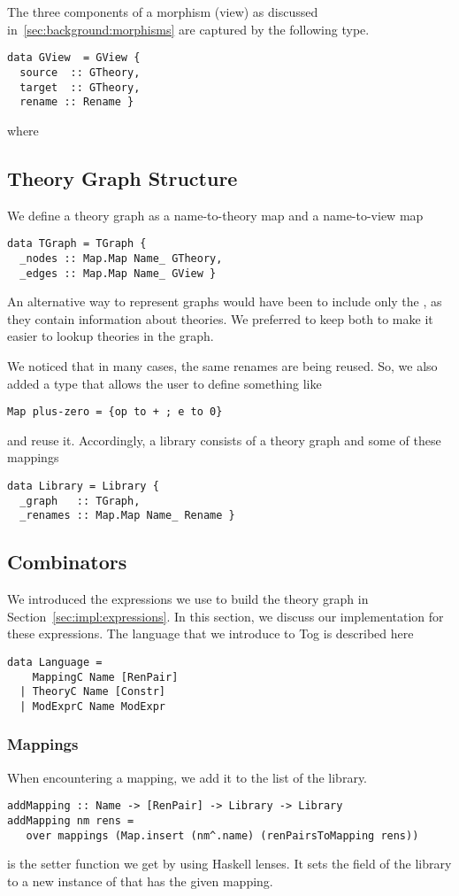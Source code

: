 The three components of a morphism (view) as discussed in~\ref{sec:background:morphisms} are captured by the following type. 
\begin{verbatim}
data GView  = GView {
  source  :: GTheory,
  target  :: GTheory,
  rename :: Rename }  
\end{verbatim}
where 

\subsection{Theory Graph Structure}
We define a theory graph as a name-to-theory map and a name-to-view map 
\begin{verbatim}
data TGraph = TGraph { 
  _nodes :: Map.Map Name_ GTheory,
  _edges :: Map.Map Name_ GView } 
\end{verbatim}
An alternative way to represent graphs would have been to include only the , as they contain information about theories. We preferred to keep both to make it easier to lookup theories in the graph. 

We noticed that in many cases, the same renames are being reused. So, we also added a  type that allows the user to define something like 
\begin{lstlisting}
Map plus-zero = {op to + ; e to 0}
\end{lstlisting}
and reuse it. Accordingly, a library consists of a theory graph and some of these mappings 
\begin{verbatim}
data Library = Library {
  _graph   :: TGraph,
  _renames :: Map.Map Name_ Rename }
\end{verbatim}

\subsection{Combinators}
We introduced the expressions we use to build the theory graph in Section~\ref{sec:impl:expressions}. In this section, we discuss our implementation for these expressions. The language that we introduce to Tog is described here 
\begin{lstlisting}
data Language = 
    MappingC Name [RenPair]
  | TheoryC Name [Constr]
  | ModExprC Name ModExpr
\end{lstlisting}

\subsubsection{Mappings}
When encountering a mapping, we add it to the  list of the library. 
\begin{verbatim}
addMapping :: Name -> [RenPair] -> Library -> Library
addMapping nm rens = 
   over mappings (Map.insert (nm^.name) (renPairsToMapping rens))
\end{verbatim}
 is the setter function we get by using Haskell lenses. It sets the  field of the library to a new instance of  that has the given mapping. 

